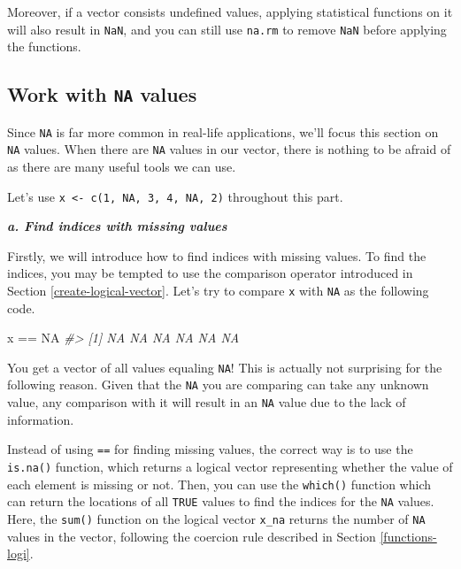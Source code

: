 \documentclass[
]{book}
\newenvironment{Shaded}{\begin{snugshade}}{\end{snugshade}}
\newcommand{\CommentTok}[1]{\textcolor[rgb]{0.56,0.35,0.01}{\textit{#1}}}
\newcommand{\ConstantTok}[1]{\textcolor[rgb]{0.00,0.00,0.00}{#1}}
\newcommand{\NormalTok}[1]{#1}
\newcommand{\SpecialCharTok}[1]{\textcolor[rgb]{0.00,0.00,0.00}{#1}}
\begin{document}
Moreover, if a vector consists undefined values, applying statistical functions on it will also result in \texttt{NaN}, and you can still use \texttt{na.rm} to remove \texttt{NaN} before applying the functions.

\hypertarget{work-with-na-values}{%
\subsection{\texorpdfstring{Work with \texttt{NA} values}{Work with NA values}}\label{work-with-na-values}}

Since \texttt{NA} is far more common in real-life applications, we'll focus this section on \texttt{NA} values. When there are \texttt{NA} values in our vector, there is nothing to be afraid of as there are many useful tools we can use.

Let's use \texttt{x\ \textless{}-\ c(1,\ NA,\ 3,\ 4,\ NA,\ 2)} throughout this part.

\textbf{\emph{a. Find indices with missing values}}

Firstly, we will introduce how to find indices with missing values. To find the indices, you may be tempted to use the comparison operator introduced in Section \ref{create-logical-vector}. Let's try to compare \texttt{x} with \texttt{NA} as the following code.

\begin{Shaded}
\begin{Highlighting}[]
\NormalTok{x }\SpecialCharTok{==} \ConstantTok{NA}
\CommentTok{\#\textgreater{} [1] NA NA NA NA NA NA}
\end{Highlighting}
\end{Shaded}

You get a vector of all values equaling \texttt{NA}! This is actually not surprising for the following reason. Given that the \texttt{NA} you are comparing can take any unknown value, any comparison with it will result in an \texttt{NA} value due to the lack of information.

Instead of using \texttt{==} for finding missing values, the correct way is to use the \texttt{is.na()} function, which returns a logical vector representing whether the value of each element is missing or not. Then, you can use the \texttt{which()} function which can return the locations of all \texttt{TRUE} values to find the indices for the \texttt{NA} values. Here, the \texttt{sum()} function on the logical vector \texttt{x\_na} returns the number of \texttt{NA} values in the vector, following the coercion rule described in Section \ref{functions-logi}.
\end{document}
